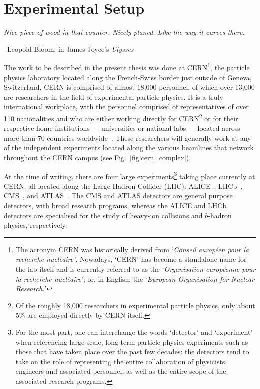 \chapter{Experimental Setup}

	

\epigraph{\textit{Nice piece of wood in that counter. Nicely planed. Like the way it curves there.}}{--Leopold Bloom, in James Joyce's \textit{Ulysses}}

The work to be described in the present thesis was done at CERN\footnote{
The acronym CERN was historically derived from `\textit{Conseil europ{\'e}en pour la recherche
nucl{\'e}aire'}. Nowadays, `CERN' has become a standalone name for the lab itself and
is currently referred to as the `\textit{Organisation europ{\'e}enne pour la recherche nucl{\'e}aire}'; or, in English: the
`\textit{European Organisation for Nuclear Research.}'}, the particle
physics laboratory located along the French-Swiss border just outside of Geneva, Switzerland.
CERN is comprised of almost 18,000 personnel, of which over 13,000 are researchers in the
field of experimental particle physics.
It is a truly international workplace, with the personnel comprised of representatives of over 110 nationalities
and who are either working directly
for CERN\footnote{Of the roughly 18,000 researchers in experimental particle physics, only about
5\% are employed directly by CERN itself.} or for their respective home institutions
--- universities or national labs ---
located across more than 70 countries worldwide~\cite{CERN-HR-STAFF-STAT-2018}.
These researchers will generally work at any of the independent experiments located along the various
beamlines that network throughout the CERN campus (see Fig.~\ref{fig:cern_complex}).

At the time of writing, there are four large experiments\footnote{For the most part, one can interchange the
words `detector' and `experiment' when referencing large-scale, long-term particle physics experiments such as those
that have taken place over the past few decades: the detectors tend to take on the role of representing
the entire collaboration of physicists, engineers and associated personnel, as well as the entire scope of the associated
research programs.} taking place currently at CERN, all located along the Large
Hadron Collider (LHC): ALICE~\cite{ALICECollab}, LHCb~\cite{LHCbCollab}, CMS~\cite{CMSCollab},
and ATLAS~\cite{ATLASCollab}. The CMS and ATLAS detectors are general purpose detectors, with broad
research programs, whereas the ALICE and LHCb detectors are specialised for the study of heavy-ion
collisions and $b$-hadron physics, respectively.

